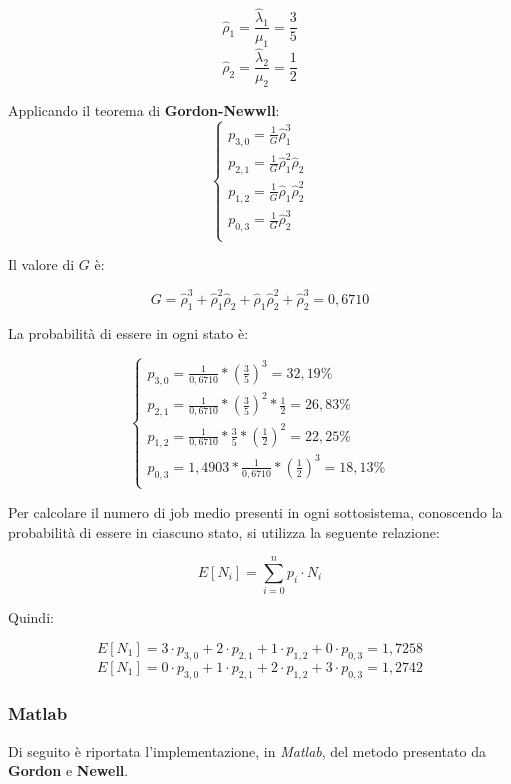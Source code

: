 $$\widehat{\rho}_1 = \frac{\widehat{\lambda}_1}{\mu_1}=\frac{3}{5} $$
$$\widehat{\rho}_2 = \frac{\widehat{\lambda}_2}{\mu_2}=\frac{1}{2}$$

Applicando il teorema di \textbf{Gordon-Newwll}:
$$
\begin{cases}
  p_{3,0} = \frac{1}{G} \widehat{\rho}_1^3 \\
  p_{2,1} = \frac{1}{G} \widehat{\rho}_1^2 \widehat{\rho}_2 \\
  p_{1,2} = \frac{1}{G} \widehat{\rho}_1 \widehat{\rho}_2^2 \\
  p_{0,3} = \frac{1}{G} \widehat{\rho}_2^3 \\
\end{cases}
$$

Il valore di $G$ è:

$$ G = \widehat{\rho}_1^3  +  \widehat{\rho}_1^2 \widehat{\rho}_2 + \widehat{\rho}_1 \widehat{\rho}_2^2 + \widehat{\rho}_2^3 = 0,6710$$

La probabilità di essere in ogni stato è:

$$
\begin{cases}
  p_{3,0} = \frac{1}{0,6710} * (\frac{3}{5})^3=32,19\%\\
  p_{2,1} =  \frac{1}{0,6710} * (\frac{3}{5})^2*\frac{1}{2}=26,83\%\\
  p_{1,2} = \frac{1}{0,6710} * \frac{3}{5}*(\frac{1}{2})^2=22,25\%\\
  p_{0,3} = 1,4903 *\frac{1}{0,6710} * (\frac{1}{2})^3=18,13\%\\
\end{cases}
$$

Per calcolare il numero di job medio presenti in ogni sottosistema, conoscendo
la probabilità di essere in ciascuno stato, si utilizza la seguente relazione:

$$ E[N_i] = \sum_{i=0}^n p_i\cdot N_i $$

Quindi:

$$ E[N_1] = 3 \cdot p_{3,0} + 2 \cdot p_{2,1} + 1 \cdot p_{1,2} + 0 \cdot p_{0,3}=1,7258$$
$$ E[N_1] = 0 \cdot p_{3,0} + 1 \cdot p_{2,1} + 2 \cdot p_{1,2} + 3 \cdot p_{0,3}=1,2742$$
\vspace{1cm}
\subsubsection{Matlab}
Di seguito è riportata l'implementazione, in \textit{Matlab}, del metodo presentato
da \textbf{Gordon} e \textbf{Newell}.\\



